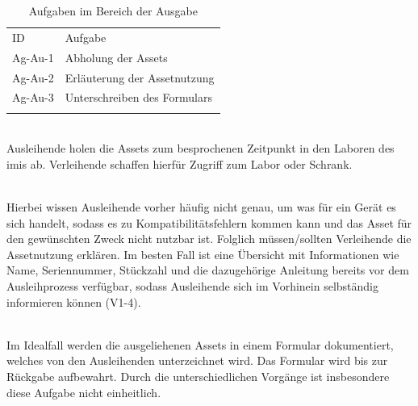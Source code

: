 \begin{table}[h]
        \centering
        \caption{Aufgaben im Bereich der Ausgabe}
        \begin{tabular}{ll}
                \arrayrulecolor{maincolor}\hline
                \sffamily\color{maincolor}ID & \sffamily\color{maincolor}Aufgabe
                \\
                \arrayrulecolor{maincolor}\hline
                Ag-Au-1                      & Abholung der Assets
                \\
                Ag-Au-2                      & Erläuterung der Assetnutzung
                \\
                Ag-Au-3                      & Unterschreiben des Formulars
                \\
                \arrayrulecolor{maincolor}\hline
        \end{tabular}
        \label{table:Ag-Au}
\end{table}

{\sffamily\color{maincolor}{Ag-Au-1 | Abholung der Assets}}\\
Ausleihende holen die Assets zum besprochenen Zeitpunkt in den Laboren des
\ac{imis} ab. Verleihende schaffen hierfür Zugriff zum Labor oder Schrank.

        {\sffamily\color{maincolor}{Ag-Au-2 | Erläuterung der Assetnutzung}}\\
Hierbei wissen Ausleihende vorher häufig nicht genau, um was für ein Gerät es
sich handelt, sodass es zu Kompatibilitätsfehlern kommen kann und das Asset für
den gewünschten Zweck nicht nutzbar ist. Folglich müssen/sollten
Verleihende die Assetnutzung erklären. Im besten Fall ist eine Übersicht mit
Informationen wie Name, Seriennummer, Stückzahl und die dazugehörige Anleitung
bereits vor dem Ausleihprozess verfügbar, sodass Ausleihende sich im Vorhinein
selbständig informieren können (V1-4).

        {\sffamily\color{maincolor}{Ag-Au-3 | Unterschreiben des Formulars}}\\
Im Idealfall werden die ausgeliehenen Assets in einem Formular dokumentiert,
welches von den Ausleihenden unterzeichnet wird. Das Formular wird bis zur
Rückgabe aufbewahrt. Durch die unterschiedlichen Vorgänge ist insbesondere diese
Aufgabe nicht einheitlich.

